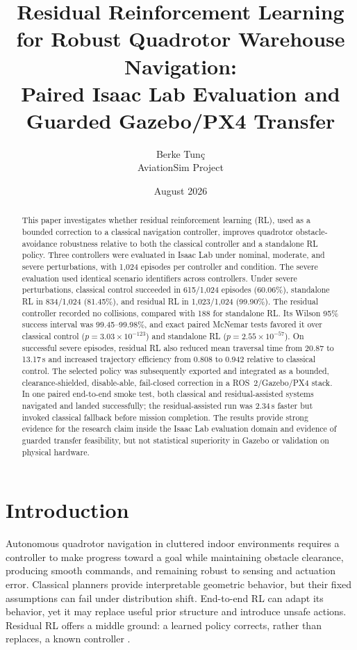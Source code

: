 \documentclass[10pt,twocolumn]{article}
\title{\textbf{Residual Reinforcement Learning for Robust Quadrotor Warehouse Navigation:}\\
Paired Isaac Lab Evaluation and Guarded Gazebo/PX4 Transfer}
\author{Berke Tun\c{c}\\AviationSim Project}
\date{August 2026}
\begin{document}
\maketitle

\begin{abstract}
This paper investigates whether residual reinforcement learning (RL), used as a bounded correction to a classical navigation controller, improves quadrotor obstacle-avoidance robustness relative to both the classical controller and a standalone RL policy. Three controllers were evaluated in Isaac Lab under nominal, moderate, and severe perturbations, with 1,024 episodes per controller and condition. The severe evaluation used identical scenario identifiers across controllers. Under severe perturbations, classical control succeeded in 615/1,024 episodes (60.06\%), standalone RL in 834/1,024 (81.45\%), and residual RL in 1,023/1,024 (99.90\%). The residual controller recorded no collisions, compared with 188 for standalone RL. Its Wilson 95\% success interval was 99.45--99.98\%, and exact paired McNemar tests favored it over classical control ($p=3.03\times10^{-123}$) and standalone RL ($p=2.55\times10^{-57}$). On successful severe episodes, residual RL also reduced mean traversal time from 20.87 to 13.17\,s and increased trajectory efficiency from 0.808 to 0.942 relative to classical control. The selected policy was subsequently exported and integrated as a bounded, clearance-shielded, disable-able, fail-closed correction in a ROS~2/Gazebo/PX4 stack. In one paired end-to-end smoke test, both classical and residual-assisted systems navigated and landed successfully; the residual-assisted run was 2.34\,s faster but invoked classical fallback before mission completion. The results provide strong evidence for the research claim inside the Isaac Lab evaluation domain and evidence of guarded transfer feasibility, but not statistical superiority in Gazebo or validation on physical hardware.
\end{abstract}

\section{Introduction}
Autonomous quadrotor navigation in cluttered indoor environments requires a controller to make progress toward a goal while maintaining obstacle clearance, producing smooth commands, and remaining robust to sensing and actuation error. Classical planners provide interpretable geometric behavior, but their fixed assumptions can fail under distribution shift. End-to-end RL can adapt its behavior, yet it may replace useful prior structure and introduce unsafe actions. Residual RL offers a middle ground: a learned policy corrects, rather than replaces, a known controller \cite{johannink2019}.
\end{document}
